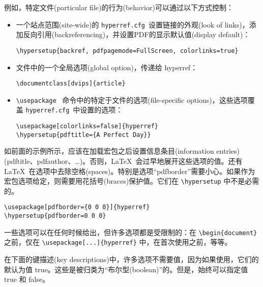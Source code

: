 \documentclass{article}
\newcommand*{\cs}[1]{%
  \texttt{\textbackslash #1}%
}
\begin{document}
例如，特定文件(particular file)的行为(behavior)可以通过以下方式控制：
\begin{itemize}
\item	一个站点范围(site-wide)的 \texttt{hyperref.cfg}\ 设置链接的外观(look of links)，添加反向引用(backreferencing)，并设置PDF的显示默认值(display default)：
\begin{verbatim}
\hypersetup{backref, pdfpagemode=FullScreen, colorlinks=true}
\end{verbatim}

\item	文件中的一个全局选项(global option)，传递给 \textsf{hyperref}：
\begin{verbatim}
\documentclass[dvips]{article}
\end{verbatim}

\item	\cs{usepackage}\ 命令中的特定于文件的选项(file-specific options)，这些选项覆盖 \texttt{hyperref.cfg}\ 中设置的选项：
\begin{verbatim}
\usepackage[colorlinks=false]{hyperref}
\hypersetup{pdftitle={A Perfect Day}}
\end{verbatim}
\end{itemize}

如前面的示例所示，应该在加载宏包之后设置信息条目(information entries)(pdftitle、pdfauthor、\dots)。否则，\LaTeX\ 会过早地展开这些选项的值。还有 \LaTeX\ 在选项中去除空格(spaces)。特别是选项“pdfborder”需要小心。如果作为宏包选项给定，则需要用花括号(braces)保护值。它们在 \verb|\hypersetup| 中不是必需的。

\begin{verbatim}
\usepackage[pdfborder={0 0 0}]{hyperref}
\hypersetup{pdfborder=0 0 0}
\end{verbatim}

一些选项可以在任何时候给出，但许多选项都是受限制的：在 \verb|\begin{document}| 之前，仅在 \verb|\usepackage[...]{hyperref}| 中，在首次使用之前，等等。

在下面的键描述(key descriptions)中，许多选项不需要值，因为如果使用，它们的默认为值 true。这些是被归类为“布尔型(boolean)”的。但是，始终可以指定值 true 和 false。
\end{document}
